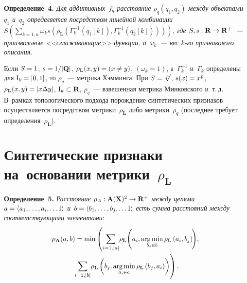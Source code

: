 \begin{multicols}{2}
\smallskip

\noindent
\textbf{Определение~4.} \textit{Для аддитивных~$f_q$ расстояние 
$\rho_q(q_1,q_2)$ между объектами $q_1$ и~$q_2$ определяется посредством 
линейной комбинации $S\left( \sum\nolimits_{k=\overline{1,n}} \omega_k 
{s}\left(\rho_{\mathbf{L}} \left(\Gamma_k^{-1}(q_1[k]),  
\Gamma_k^{-1}\left(q_2[k]\right)\right)\right)\right)$, где ${S}, {s}: 
\mathbf{R}\hm\to \mathbf{R}^+$~--- произвольные <<сглаживающие>> 
функции, а~$\omega_k$~--- вес $k$-го признакового описания}. 
     
     Если ${S}\hm=1$, ${s}\hm= 1/\vert\mathbf{Q}\vert$, 
$\rho_{\mathbf{L}}(x,y)\hm= (x\not= y)$, $(\omega_k=1)$, а~$\Gamma_k^{-1}$ 
и~$\Gamma_k$ определены для $\mathrm{I}_k\hm= [0,1]$, то $\rho_q$~--- 
метрика Хэмминга. При ${S}\hm= \sqrt[p]{\vphantom{1}}$,  ${s}(x)\hm= x^p$, 
$\rho_{\mathbf{L}}(x,y)\hm= \vert x\Delta y\vert$, $\mathrm{I}_k\hm\subset 
\mathbf{R}$, $\rho_q$~--- взвешенная мет\-ри\-ка Минковского и~т.\,д. 
В~рамках топологического подхода порождение синтетических признаков 
осуществляется посредством метрики~$\rho_{\mathbf{L}}$ либо 
метрики~$\rho_q$ (последнее требует определения~$\rho_{\mathbf{L}}$). 

\vspace*{-6pt}
     
\section{Синтетические признаки на~основании 
метрики~$\rho_{\mathbf{L}}$}

\vspace*{-2pt}

\noindent
\textbf{Определение~5.} \textit{Расстояние $\rho_A: 
\mathbf{A}(\mathbf{X})^2\hm\to \mathbf{R}^+$ между цепями $a\hm= \langle 
a_1, \ldots , a_i, \ldots \mathrm{I}\rangle$ и~$b\hm= \langle b_1, \ldots , b_j, 
\ldots \mathrm{I}\rangle$ есть сумма расстояний между 
соответствующими элементами}: 
\begin{multline*}
\rho_{\mathbf{A}}(a,b)= \min \left( \sum\limits_{i=1, \vert a\vert} \!\rho_{\mathbf{L}} \!\left( a_i, \mathop{\mathrm{arg}\,\mathrm{min}}\limits_{b_j\in b}
\rho_{\mathbf{L}}\left(a_i, b_j\right)\!\right) \!,\right.\\
\left.\sum\limits_{i=1,\vert b\vert} \!\rho_{\mathbf{L}}\left(b_j, \mathop{\mathrm{arg}\,\mathrm{min}}\limits_{a_i\in 
a} \rho_{\mathbf{L}} \left(b_j,a_i\right)\right)\right).
\end{multline*}
     
     
     

\end{multicols}
